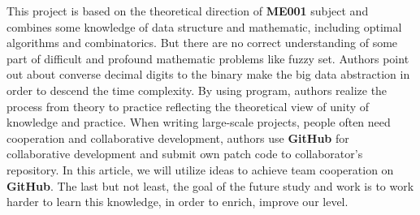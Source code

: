 This project is based on the theoretical direction of \textbf{ME001} subject and 
combines some knowledge of data structure and mathematic, 
including optimal algorithms and combinatorics. But there are no correct understanding of 
some part of difficult and profound mathematic problems like fuzzy set.
Authors point out about converse decimal digits to the binary make the big data abstraction in order to descend the time complexity.
By using program, authors realize the process from theory to practice reflecting the theoretical view of unity of knowledge and practice.
When writing large-scale projects, people often need cooperation and collaborative development, 
authors use \textbf{GitHub} for collaborative development and submit own patch code to collaborator's repository.
In this article, we will utilize ideas to achieve team cooperation on \textbf{GitHub}.
The last but not least, the goal of the future study and work is to work harder to learn this knowledge, 
in order to enrich, improve our level.

